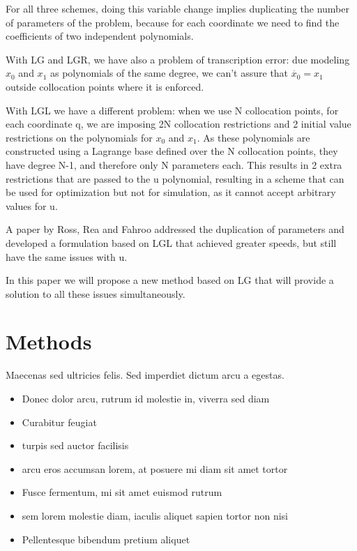 \documentclass[twoside,twocolumn]{article}
\begin{document}
For all three schemes, doing this variable change implies duplicating the number of parameters of the problem, because for each coordinate we need to find the coefficients of two independent polynomials. 

With LG and LGR, we have also a problem of transcription error: due modeling $x_0$ and $x_1$ as polynomials of the same degree, we can't assure that $\dot{x_0} = x_1$ outside collocation points where it is enforced.

With LGL we have a different problem: when we use N collocation points, for each coordinate q, we are imposing 2N collocation restrictions and 2 initial value restrictions on the polynomials for $x_0$ and $x_1$. As these polynomials are constructed using a Lagrange base defined over the N collocation points, they have degree N-1, and therefore only N parameters each. This results in 2 extra restrictions that are passed to the u polynomial, resulting in a scheme that can be used for optimization but not for simulation, as it cannot accept arbitrary values for u.

A paper by Ross, Rea and Fahroo \cite{ross_02} addressed the duplication of parameters and developed a formulation based on LGL that achieved greater speeds, but still have the same issues with u.

In this paper we will propose a new method based on LG that will provide a solution to all these issues simultaneously.

\section{Methods}

Maecenas sed ultricies felis. Sed imperdiet dictum arcu a egestas. 
\begin{itemize}
\item Donec dolor arcu, rutrum id molestie in, viverra sed diam
\item Curabitur feugiat
\item turpis sed auctor facilisis
\item arcu eros accumsan lorem, at posuere mi diam sit amet tortor
\item Fusce fermentum, mi sit amet euismod rutrum
\item sem lorem molestie diam, iaculis aliquet sapien tortor non nisi
\item Pellentesque bibendum pretium aliquet
\end{itemize}
\blindtext %
\end{document}
